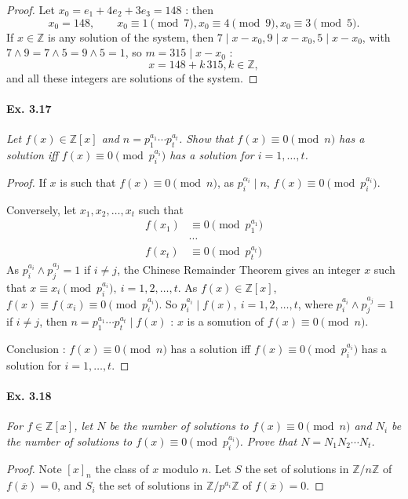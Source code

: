 \documentclass[11pt,a4paper]{article}
\newcommand{\Z}{\mathbb{Z}}
\begin{document}
{\begin{proof}
Let $x_0 = e_1 + 4 e_2 + 3 e_3 = 148 $ : then 
$$x_0 = 148,\qquad x_0 \equiv 1 \pmod 7, x_0 \equiv 4 \pmod 9, x_0 \equiv 3 \pmod 5.$$
If $x\in \Z$ is any solution of the system, then $7 \mid x-x_0, 9 \mid x-x_0, 5 \mid x-x_0$, with $7\wedge 9 = 7 \wedge 5 = 9 \wedge 5 = 1$, so $m = 315 \mid x - x_0$ : 
$$x = 148 + k\, 315, k \in \Z,$$
and all these integers are solutions of the system.
\end{proof}

\paragraph{Ex. 3.17}

{\it Let $f(x) \in \Z[x]$ and $n = p_1^{a_1} \cdots p_t^{a_t}$. Show that $f(x) \equiv 0 \pmod n$ has a solution iff $f(x) \equiv 0 \pmod {p_i^{a_i}}$ has a solution for $i = 1, \ldots, t$.
}

\begin{proof}
If $x$ is such that $f(x) \equiv 0 \pmod n$, as $p_i^{\alpha_i} \mid n$, $f(x) \equiv 0 \pmod{p_i^{a_i}}$.

Conversely, let $x_1,x_2,\ldots,x_t$ such that
\begin{align*}
f(x_1)&\equiv 0 \pmod{p_1^{a_1}}\\
&\cdots\\
f(x_t)&\equiv 0 \pmod{p_t^{a_t}}
\end{align*}
As $p_i^{a_i} \wedge p_j^{a_j}=1$ if $i\ne j$, the Chinese Remainder Theorem gives an integer $x$ such that $x\equiv x_i \pmod {p_i^{a_i}},\ i=1,2,\ldots,t$. As $f(x)\in \Z[x]$, $f(x) \equiv f(x_i) \equiv 0 \pmod {p_i^{a_i}}$. So $p_i^{a_i} \mid f(x),\ i=1,2,\ldots,t$, where $p_i^{a_i} \wedge p_j^{a_j}=1$ if $i\ne j$, then $n = p_1^{a_1} \cdots p_t^{a_t} \mid f(x)$ : $x$ is a somution of $f(x) \equiv 0 \pmod n$.

Conclusion : $f(x) \equiv 0 \pmod n$ has a solution iff $f(x) \equiv 0 \pmod {p_i^{a_i}}$ has a solution for $i = 1, \ldots, t$.
\end{proof}

\paragraph{Ex. 3.18}

{\it For $f \in \Z[x]$, let $N$ be the number of solutions to $f(x) \equiv 0 \pmod n$ and $N_i$ be the number of solutions to $f(x) \equiv 0 \pmod {p_i^{a_i}}$. Prove that $N = N_1N_2\cdots N_t$.
}

\begin{proof}
Note $[x]_n$ the class of $x$ modulo $n$. Let $S$ the set of solutions in $\Z/n\Z$ of $f(\overline{x}) = 0$, and $S_i$ the set of solutions in $\Z/p^{a_i}\Z$ of $f(\overline{x}) = 0$.


\end{proof}}
\end{document}
